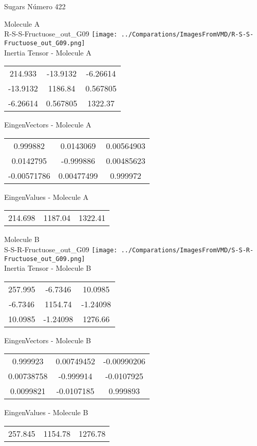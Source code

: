 \vtab[-2cm]
\begin{center}
{\large Sugars \tab Número 422}
\end{center}
\begin{multicols}{2}
\begin{center}

Molecule A \\ 
R-S-S-Fructuose\_out\_G09
\texttt{[image: ../Comparations/ImagesFromVMD/R-S-S-Fructuose\_out\_G09.png]}
\\
Inertia Tensor - Molecule A \\
\vtab

\begin{tabular}{|c c c|}
214.933	 & 	-13.9132	 & 	-6.26614	 \\
-13.9132	 & 	1186.84	 & 	0.567805	 \\
-6.26614	 & 	0.567805	 & 	1322.37
\end{tabular}

\vtab
 EingenVectors - Molecule A     \\
\vtab
\begin{tabular}{|c c c|}
0.999882	 & 	0.0143069	 & 	0.00564903	 \\
0.0142795	 & 	-0.999886	 & 	0.00485623	 \\
-0.00571786	 & 	0.00477499	 & 	0.999972
\end{tabular}

\vtab
 EingenValues - Molecule A     \\
\vtab
\begin{tabular}{|c c c|}
214.698	 & 	1187.04	 & 	1322.41	 \\
\end{tabular}
\columnbreak

Molecule B \\ 
S-S-R-Fructuose\_out\_G09
\texttt{[image: ../Comparations/ImagesFromVMD/S-S-R-Fructuose\_out\_G09.png]}
\\
Inertia Tensor - Molecule B \\
\vtab

\begin{tabular}{|c c c|}
257.995	 & 	-6.7346	 & 	10.0985	 \\
-6.7346	 & 	1154.74	 & 	-1.24098	 \\
10.0985	 & 	-1.24098	 & 	1276.66
\end{tabular}

\vtab
 EingenVectors - Molecule B     \\
\vtab
\begin{tabular}{|c c c|}
0.999923	 & 	0.00749452	 & 	-0.00990206	 \\
0.00738758	 & 	-0.999914	 & 	-0.0107925	 \\
0.0099821	 & 	-0.0107185	 & 	0.999893
\end{tabular}

\vtab
 EingenValues - Molecule B     \\
\vtab
\begin{tabular}{|c c c|}
257.845	 & 	1154.78	 & 	1276.78	 \\
\end{tabular}

\end{center}
\end{multicols}
